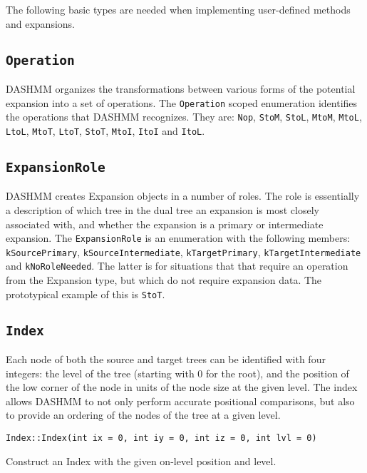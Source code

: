 The following basic types are needed when implementing user-defined methods and
expansions.

\subsection{\texttt{Operation}}

DASHMM organizes the transformations between various forms of the potential
expansion into a set of operations. The \texttt{Operation} scoped enumeration
identifies the operations that DASHMM recognizes. They are: \texttt{Nop},
\texttt{StoM}, \texttt{StoL}, \texttt{MtoM}, \texttt{MtoL}, \texttt{LtoL},
\texttt{MtoT}, \texttt{LtoT}, \texttt{StoT}, \texttt{MtoI}, \texttt{ItoI}
and \texttt{ItoL}.

\subsection{\texttt{ExpansionRole}}

DASHMM creates Expansion objects in a number of roles. The role is essentially
a description of which tree in the dual tree an expansion is most closely
associated with, and whether the expansion is a primary or intermediate
expansion.  The \texttt{ExpansionRole} is an enumeration with the following
members: \texttt{kSourcePrimary}, \texttt{kSourceIntermediate},
\texttt{kTargetPrimary}, \texttt{kTargetIntermediate} and
\texttt{kNoRoleNeeded}. The latter is for situations that that require an
operation from the Expansion type, but which do not require expansion data.
The prototypical example of this is \texttt{StoT}.

\subsection{\texttt{Index}}

Each node of both the source and target trees can be identified with four
integers: the level of the tree (starting with 0 for the root), and the
position of the low corner of the node in units of the node size at the given
level. The index allows DASHMM to not only perform accurate positional
comparisons, but also to provide an ordering of the nodes of the tree at a
given level.

\begin{lstlisting}
Index::Index(int ix = 0, int iy = 0, int iz = 0, int lvl = 0)
\end{lstlisting}

\noindent Construct an Index with the given on-level position and level.

